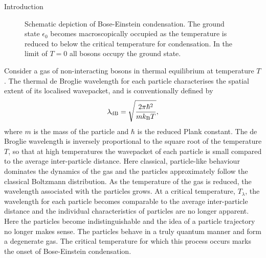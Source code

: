 \begin{chapter}{\label{cha:bose_gases}Introduction}
\begin{figure}
  \caption{\label{fig:beclevels}Schematic depiction of Bose-Einstein condensation. The ground state $\epsilon_0$ becomes macroscopically occupied as the temperature is reduced to below the critical temperature for condensation. In the limit of $T=0$ all bosons occupy the ground state.}
\end{figure}

Consider a gas of non-interacting bosons in thermal equilibrium at temperature $T$. The thermal de Broglie wavelength for each particle characterises the spatial extent of its localised wavepacket, and is conventionally defined by
\begin{equation}
\lambda_{\rm dB} = \sqrt{\frac{2\pi \hbar^2}{mk_{\rm B}T}},
\label{eq:debroglie}
\end{equation}
where $m$ is the mass of the particle and $\hbar$ is the reduced Plank constant. The de Broglie wavelength is inversely proportional to the square root of the temperature $T$, so that at high temperatures the wavepacket of each particle is small compared to the average inter-particle distance. Here classical, particle-like behaviour dominates the dynamics of the gas and the particles approximately follow the classical Boltzmann distribution. As the temperature of the gas is reduced, the wavelength associated with the particles grows. At a critical temperature, $T_\lambda$, the wavelength for each particle becomes comparable to the average inter-particle distance and the individual characteristics of particles are no longer apparent. Here the particles become indistinguishable and the idea of a particle trajectory no longer makes sense. The particles behave in a truly quantum manner and form a degenerate gas. The critical temperature for which this process occurs marks the onset of Bose-Einstein condensation.


\end{chapter}
